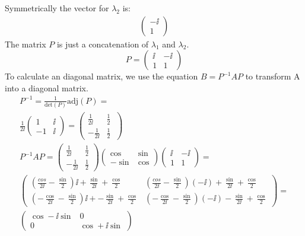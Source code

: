 Symmetrically the vector for $\lambda _2$ is:
\begin{eqnarray*}
\left( \begin{array}{c}
-\ii \\
1
\end{array} \right)
\end{eqnarray*}
The matrix $P$ is just a concatenation of $\lambda _1$ and $\lambda _2$.
\begin{equation}
P = \left( \begin{array}{cc}
\ii & -\ii \\
1 & 1
\end{array} \right)
\end{equation}
To calculate an diagonal matrix, we use the equation $B=P^{-1}AP$ to transform A into a diagonal matrix.
\begin{eqnarray*}
P^{-1} = \frac{1}{\text{det}(P)} \text{adj}(P) =\\
\frac{1}{2\ii}
\left( \begin{array}{cc}
1 & \ii \\
-1 & \ii
\end{array}
\right)
= 
\left( \begin{array}{cc}
\frac{1}{2\ii} & \frac{1}{2} \\
- \frac{1}{2\ii} & \frac{1}{2}
\end{array}
\
\right)
\\
P^{-1}AP =
\left( \begin{array}{cc}
\frac{1}{2\ii} & \frac{1}{2} \\
- \frac{1}{2\ii} & \frac{1}{2}
\end{array}
\right)
\left( \begin{array}{cc}
\cos & \sin \\
-\sin & \cos
\end{array}
\right)
\left( \begin{array}{cc}
\ii & -\ii \\
1 & 1
\end{array}
\right)
=\\
\left( \begin{array}{cc}
\left( \frac{cos}{2\ii} - \frac{\sin}{2} \right)\ii + \frac{\sin}{2 \ii} + \frac{\cos}{2} &
\left( \frac{cos}{2 \ii} - \frac{\sin}{2} \right)(-\ii) + \frac{\sin}{2 \ii}+\frac{\cos}{2} \\
\left( - \frac{\cos}{2 \ii} - \frac{\sin}{2} \right)\ii + -\frac{\sin}{2 \ii} + \frac{\cos}{2} &
\left( - \frac{\cos}{2 \ii} - \frac{\sin}{2} \right)(-\ii) - \frac{\sin}{2 \ii} + \frac{\cos}{2}
\end{array}
\right)
=\\
\left( \begin{array}{cc}
\cos - \ii \sin & 0\\
 0 & \cos + \ii \sin 
\end{array}
\right)
\end{eqnarray*}

